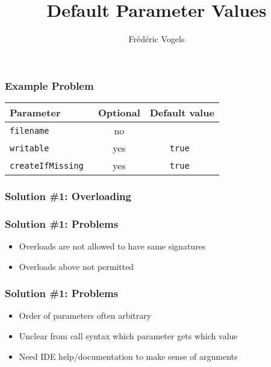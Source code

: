 \documentclass{../ucll-slides}
\title{Default Parameter Values}
\author{Fr\'ed\'eric Vogels}
\begin{document}
\begin{frame}
  \titlepage
\end{frame}

\begin{frame}
  \frametitle{Example Problem}
  \begin{center}
    \begin{tabular}{lcc}
      \textbf{Parameter} & \textbf{Optional} & \textbf{Default value} \\
      \toprule
      \tt filename & no & \\
      \tt writable & yes & \tt true \\
      \tt createIfMissing & yes & \tt true \\
    \end{tabular}
  \end{center}
\end{frame}

\begin{frame}
  \frametitle{Solution \#1: Overloading}
\end{frame}

\begin{frame}
  \frametitle{Solution \#1: Problems}
  \begin{itemize}
    \item Overloads are not allowed to have same signatures
    \item Overloads above not permitted
  \end{itemize}
\end{frame}

\begin{frame}
  \frametitle{Solution \#1: Problems}
  \begin{itemize}
    \item Order of parameters often arbitrary
    \item Unclear from call syntax which parameter gets which value
    \item Need IDE help/documentation to make sense of arguments
  \end{itemize}
\end{frame}
\end{document}
